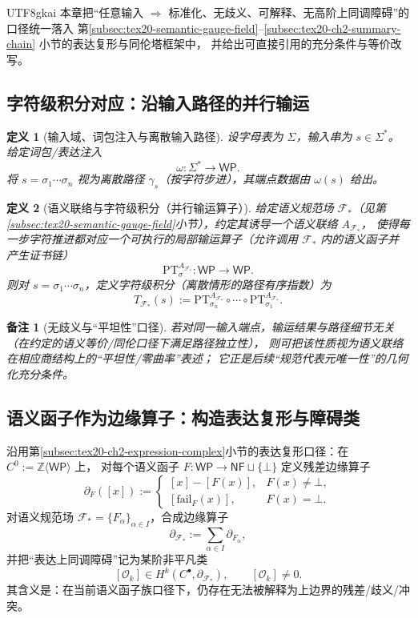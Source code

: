 \documentclass[12pt]{article}
\newtheorem{definition}{定义}[section]
\newtheorem{remark}{备注}[section]
\begin{document}
\begin{CJK*}{UTF8}{gkai}
本章把“任意输入 $\Rightarrow$ 标准化、无歧义、可解释、无高阶上同调障碍”的口径统一落入
第\ref{subsec:tex20-semantic-gauge-field}--\ref{subsec:tex20-ch2-summary-chain} 小节的表达复形与同伦塔框架中，
并给出可直接引用的充分条件与等价改写。

\subsection{字符级积分对应：沿输入路径的并行输运}
\label{subsec:tex20-ch3-character-integral}

\begin{definition}[输入域、词包注入与离散输入路径]
设字母表为 $\Sigma$，输入串为 $s\in\Sigma^\ast$。给定词包/表达注入
\[
\omega:\Sigma^\ast\to \mathsf{WP}.
\]
将 $s=\sigma_1\cdots\sigma_n$ 视为离散路径 $\gamma_s$（按字符步进），其端点数据由 $\omega(s)$ 给出。
\end{definition}

\begin{definition}[语义联络与字符级积分（并行输运算子）]
给定语义规范场 $\mathcal{F}_\ast$（见第\ref{subsec:tex20-semantic-gauge-field}小节），约定其诱导一个语义联络 $A_{\mathcal{F}_\ast}$，
使得每一步字符推进都对应一个可执行的局部输运算子（允许调用 $\mathcal{F}_\ast$ 内的语义函子并产生证书链）
\[
\mathrm{PT}^{A_{\mathcal{F}_\ast}}_{\sigma}:\mathsf{WP}\to \mathsf{WP}.
\]
则对 $s=\sigma_1\cdots\sigma_n$，定义字符级积分（离散情形的路径有序指数）为
\[
T_{\mathcal{F}_\ast}(s)
:=
\mathrm{PT}^{A_{\mathcal{F}_\ast}}_{\sigma_n}\circ\cdots\circ
\mathrm{PT}^{A_{\mathcal{F}_\ast}}_{\sigma_1}.
\]
\end{definition}

\begin{remark}[无歧义与“平坦性”口径]
若对同一输入端点，输运结果与路径细节无关（在约定的语义等价/同伦口径下满足路径独立性），
则可把该性质视为语义联络在相应商结构上的“平坦性/零曲率”表述；
它正是后续“规范代表元唯一性”的几何化充分条件。\cite{GaoZhengAppVol3}
\end{remark}

\subsection{语义函子作为边缘算子：构造表达复形与障碍类}
\label{subsec:tex20-ch3-complex-and-obstruction}

沿用第\ref{subsec:tex20-ch2-expression-complex}小节的表达复形口径：在 $C^0:=\mathbb{Z}\langle \mathsf{WP}\rangle$ 上，
对每个语义函子 $F:\mathsf{WP}\to \mathsf{NF}\sqcup\{\bot\}$ 定义残差边缘算子
\[
\partial_F([x]) :=
\begin{cases}
[x]-[F(x)], & F(x)\neq \bot,\\
[\mathrm{fail}_F(x)], & F(x)=\bot.
\end{cases}
\]
对语义规范场 $\mathcal{F}_\ast=\{F_\alpha\}_{\alpha\in I}$，合成边缘算子
\[
\partial_{\mathcal{F}_\ast}:=\sum_{\alpha\in I}\partial_{F_\alpha},
\]
并把“表达上同调障碍”记为某阶非平凡类
\[
[\mathcal{O}_k]\in H^k(C^\bullet,\partial_{\mathcal{F}_\ast}),\qquad [\mathcal{O}_k]\neq 0.
\]
其含义是：在当前语义函子族口径下，仍存在无法被解释为上边界的残差/歧义/冲突。


\end{CJK*}
\end{document}
